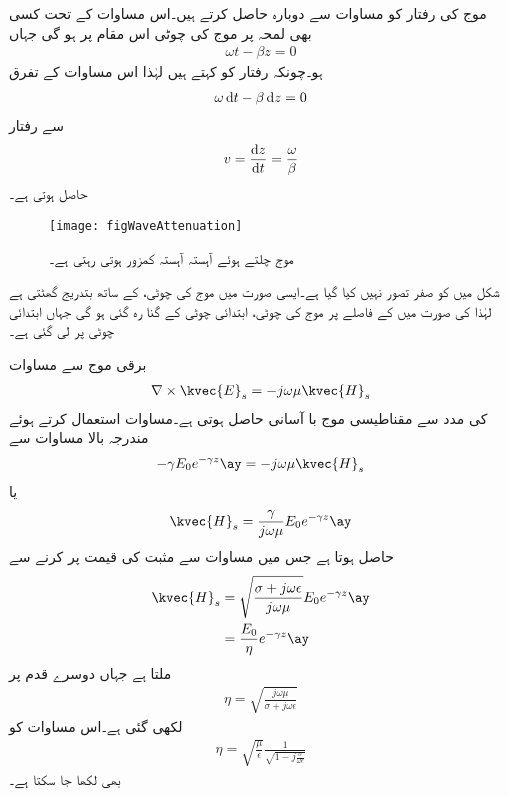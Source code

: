 موج کی رفتار کو مساوات  سے دوبارہ حاصل کرتے ہیں۔اس مساوات کے تحت کسی بھی لمحہ  پر موج کی چوٹی اس مقام پر ہو گی جہاں
\begin{align*}
\omega t -\beta z=0
\end{align*}
ہو۔چونکہ رفتار  کو کہتے ہیں لہٰذا اس مساوات کے تفرق
\begin{align*}
\omega \dif t-\beta \dif z=0
\end{align*}
سے رفتار
\begin{align}
v=\frac{\dif z}{\dif t}=\frac{\omega}{\beta}
\end{align}
حاصل ہوتی ہے۔

\begin{figure}
\centering
\texttt{[image: figWaveAttenuation]}
\caption{موج چلتے ہوئے آہستہ آہستہ کمزور ہوتی رہتی ہے۔}
\label{شکل_موج_کمزوری}
\end{figure}

شکل  میں  کو صفر تصور نہیں کیا گیا ہے۔ایسی صورت میں موج کی چوٹی،  کے ساتھ بتدریج گھٹتی  ہے لہٰذا  کی صورت میں  کے فاصلے پر موج کی چوٹی، ابتدائی چوٹی کے  گنا رہ گئی ہو گی جہاں ابتدائی چوٹی  پر لی گئی ہے۔

برقی موج  سے مساوات 
\begin{align*}
\nabla \times \kvec{E}_{s}=-j \omega \mu \kvec{H}_{s}
\end{align*}
 کی مدد سے مقناطیسی موج با آسانی حاصل ہوتی ہے۔مساوات  استعمال کرتے ہوئے مندرجہ بالا مساوات سے
\begin{align*}
-\gamma E_0 e^{-\gamma z} \ay=-j \omega \mu \kvec{H}_s
\end{align*}
یا
\begin{align*}
\kvec{H}_s=\frac{\gamma}{j \omega \mu} E_0 e^{-\gamma z} \ay
\end{align*}
حاصل ہوتا ہے جس میں مساوات  سے مثبت  کی قیمت پر کرنے سے
\begin{gather}
\begin{aligned}\label{مساوات_موج_مقناطیسی_جزو}
\kvec{H}_s&=\sqrt{\frac{\sigma +j \omega \epsilon}{j \omega \mu}} E_0 e^{-\gamma z} \ay\\
&=\frac{E_0}{\eta} e^{-\gamma z}\ay
\end{aligned}
\end{gather}
ملتا ہے جہاں دوسرے قدم پر
\begin{align}\label{مساوات-موج_قدرتی_رکاوٹ}
\eta =\sqrt{\frac{j \omega \mu}{\sigma +j \omega \epsilon}}
\end{align}
لکھی گئی ہے۔اس مساوات کو
\begin{align}\label{مساوات-موج_قدرتی_رکاوٹ_ب}
\eta =\sqrt{\frac{\mu}{\epsilon}}\frac{1}{\sqrt{1-j \frac{\sigma}{\omega \epsilon}}}
\end{align}
بھی لکھا جا سکتا ہے۔

